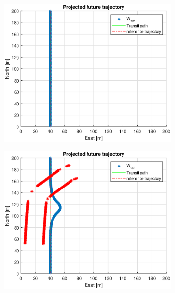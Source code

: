 \begin{figure}
    \begin{subfigure}[b]{0.49\textwidth}
        \centering
        \includegraphics[width=\textwidth]{Images/Figures/sving_HO/Simple0_f999_Frame1}
    \end{subfigure}
    \hfill
    \begin{subfigure}[b]{0.499\textwidth}
        \centering
        \includegraphics[width=\textwidth]{Images/Figures/sving_HO/Simple0_f999_Frame2}
    \end{subfigure}

\end{figure}
